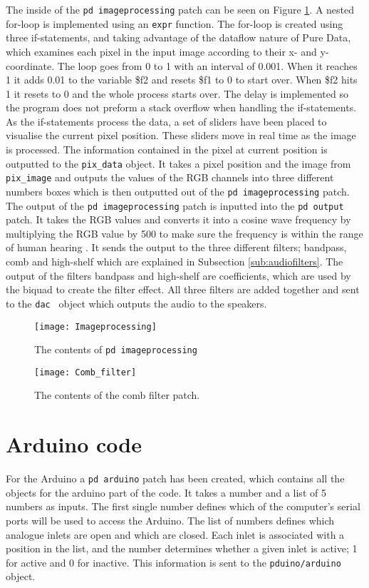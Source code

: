 The inside of the \texttt{pd imageprocessing} patch can be seen on Figure \ref{Fig:Imageprocessing}. A nested for-loop is implemented using an \texttt{expr} function. The for-loop is created using three if-statements, and taking advantage of the dataflow nature of Pure Data, which examines each pixel in the input image according to their x- and y-coordinate.
The loop goes from 0 to 1 with an interval of 0.001. When it reaches 1 it adds 0.01 to the variable \$f2 and resets \$f1 to 0 to start over. When \$f2 hits 1 it resets to 0 and the whole process starts over. The delay is implemented so the program does not preform a stack overflow when handling the if-statements. 
As the if-statements process the data, a set of sliders have been placed to visualise the current pixel position. These sliders move in real time as the image is processed. The information contained in the pixel at current position is outputted to the \texttt{pix\_data} object. It takes a pixel position and the image from \texttt{pix\_image} and outputs the values of the RGB channels into three different numbers boxes which is then outputted out of the \texttt{pd imageprocessing} patch. The output of the \texttt{pd imageprocessing} patch is inputted into the \texttt{pd output} patch. It takes the RGB values and converts it into a cosine wave frequency by multiplying the RGB value by 500 to make sure the frequency is within the range of human hearing \cite{steiglitz1997digital}. It sends the output to the three different filters; bandpass, comb and high-shelf which are explained in Subsection \ref{sub:audiofilters}. The output of the filters bandpass and high-shelf are coefficients, which are used by the biquad to create the filter effect. All three filters are added together and sent to the \texttt{dac~} object which outputs the audio to the speakers. 

\begin{figure}
\centering
\texttt{[image: Imageprocessing]}
\caption{The contents of \texttt{pd imageprocessing}}
\label{Fig:Imageprocessing}
\end{figure}

\begin{figure}
\centering
\texttt{[image: Comb\_filter]}
\caption{The contents of the comb filter patch.}
\label{Fig:Comb_filter}
\end{figure}

\section{Arduino code}
For the Arduino a \texttt{pd arduino} patch has been created, which contains all the objects for the arduino part of the code. It takes a number and a list of 5 numbers as inputs. The first single number defines which of the computer's serial ports will be used to access the Arduino. The list of numbers defines which analogue inlets are open and which are closed. Each inlet is associated with a position in the list, and the number determines whether a given inlet is active; 1 for active and 0 for inactive. This information is sent to the \texttt{pduino/arduino} object.

